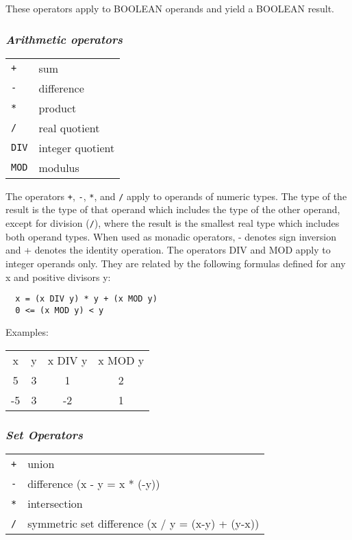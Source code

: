 \noindent
These operators apply to BOOLEAN operands and yield a BOOLEAN result.

\subsubsection{\em Arithmetic operators}

\begin{tabular}{ll}
        \verb|+|   & sum                 \\
        \verb|-|   & difference          \\
        \verb|*|   & product             \\
        \verb|/|   & real quotient       \\
        \verb|DIV| & integer quotient    \\
        \verb|MOD| & modulus             \\
\end{tabular}

\noindent
The operators \verb|+|, \verb|-|, \verb|*|, and \verb|/|
apply to operands of numeric types. The
type of the result is the type of that operand which includes the
type of the other operand, except for division (\verb|/|), where the result
is the smallest real type which includes both operand types. When
used as monadic operators, - denotes sign inversion and + denotes
the identity operation. The operators DIV and MOD apply to integer
operands only. They are related by the following formulas defined
for any x and positive divisors y:
\begin{verbatim}
  x = (x DIV y) * y + (x MOD y)
  0 <= (x MOD y) < y
\end{verbatim}

\noindent
Examples:
\begin{flushleft}
\begin{tabular}{cccc}
x  &  y  & x DIV y & x MOD y \\
5  &  3  &   1     &    2    \\
-5 &  3  &  -2     &    1    \\
\end{tabular}
\end{flushleft}

\subsubsection{\em Set Operators}

\begin{tabular}{ll}
        \verb|+| &  union                                            \\
        \verb|-| &  difference  (x - y = x * (-y))                   \\
        \verb|*| &  intersection                                     \\
        \verb|/| &  symmetric set difference (x / y = (x-y) + (y-x)) \\
\end{tabular}


